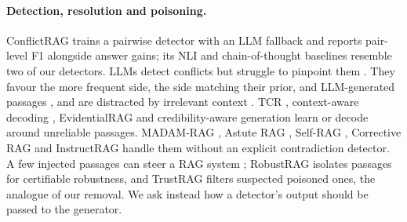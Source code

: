 \paragraph{Detection, resolution and poisoning.}
ConflictRAG \citep{wang2026conflictrag} trains a pairwise detector with an LLM fallback and reports pair-level F1
alongside answer gains; its NLI and chain-of-thought baselines resemble two of our detectors. LLMs detect conflicts but struggle to pinpoint them
\citep{gokul2025contradiction,wang2024resolving,jiayang2024econ}. They favour the more frequent side, the side matching
their prior, and LLM-generated passages \citep{jin2024tugofwar,kortukov2024realistic,tan2024blinded}, and are
distracted by irrelevant context \citep{shi2023distracted,schuster2026whose}. TCR \citep{ye2026tcr}, context-aware
decoding \citep{shi2024cad}, EvidentialRAG \citep{hossain2026evidentialrag} and credibility-aware generation
\citep{pan2024credibility} learn or decode around unreliable passages. MADAM-RAG \citep{wang2025madam}, Astute RAG
\citep{wang2025astute}, Self-RAG \citep{asai2024selfrag}, Corrective RAG \citep{yan2024crag} and InstructRAG
\citep{wei2025instructrag} handle them without an explicit contradiction detector. A few injected passages can steer a RAG
system \citep{zou2025poisonedrag}; RobustRAG \citep{xiang2024robustrag} isolates passages for certifiable robustness,
and TrustRAG \citep{zhou2025trustrag} filters suspected poisoned ones, the analogue of our removal. We ask instead how
a detector's output should be passed to the generator.
